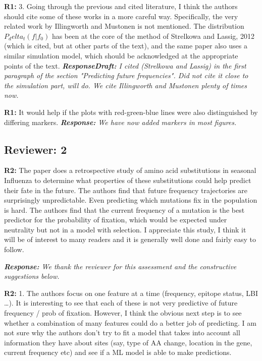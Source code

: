 \documentclass[aps,rmp,onecolumn]{revtex4-1}
\newcommand{\refa}[1]{\textbf{R1:} #1\vskip 5mm}
\newcommand{\refb}[1]{\textbf{R2:} #1\vskip 5mm}
\newcommand{\response}[1]{{\it {\color{response}\textbf{Response:} #1}}\vskip 5mm}
\newcommand{\responsedraft}[1]{{\it {\color{purple}\textbf{ResponseDraft:} #1}}\vskip 5mm}
\begin{document}
\refa{3. Going through the previous and cited literature, I think the authors should cite some of these works in a more careful way. Specifically, the very related work by Illingworth and Mustonen is not mentioned. The distribution $P_delta_t(f|f_0)$ has been at the core of
the method of Strelkowa and Lassig, 2012 (which is cited, but at other
parts of the text), and the same paper also uses a similar simulation model, which should be acknowledged at the appropriate points of the text.}
\responsedraft{I cited (Strelkowa and Lassig) in the first paragraph of the section "Predicting future frequencies". 
Did not cite it close to the simulation part, will do. 
We cite Illingworth and Mustonen plenty of times now. 
}

\refa{It would help if the plots with red-green-blue lines were also distinguished by differing markers.}
\response{We have now added markers in most figures.}


\subsection*{Reviewer: 2}

\refb{The paper does a retrospective study of amino acid substitutions in seasonal Influenza to determine what properties of these substitutions could help predict their fate in the future. The authors find that future frequency trajectories are surprisingly unpredictable. Even predicting which mutations fix in the population is hard. The authors find that the current frequency of a mutation is the best predictor for the probability of fixation, which would be expected under neutrality but not in a model with selection.
I appreciate this study, I think it will be of interest to many readers and it is generally well done and fairly easy to follow.
}

\response{We thank the reviewer for this assessment and the constructive suggestions below. }

\refb{1. The authors focus on one feature at a time (frequency, epitope status, LBI …). It is interesting to see that each of these is not very predictive of future frequency / prob of fixation. However, I think the obvious next step is to see whether a combination of many features could do a better job of predicting. I am not sure why the authors don’t try to fit a model that takes into account all information they have about sites (say, type of AA change, location in the gene, current frequency etc) and see if a ML model is able to make predictions. }
\end{document}
